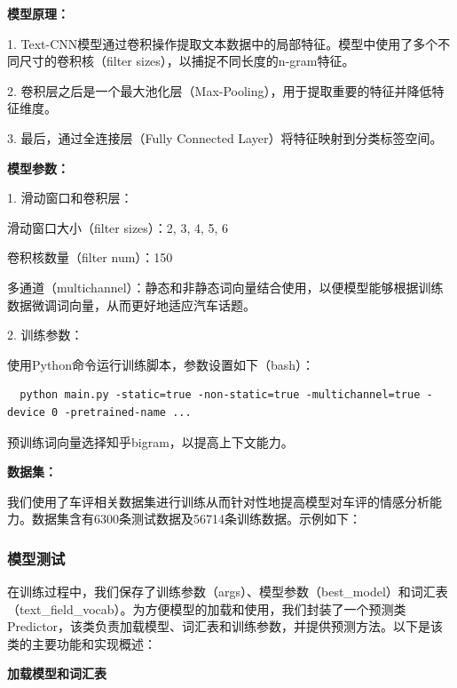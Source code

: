 \documentclass[UTF8,a4paper,15pt,titlepage,oneside]{ctexbook}
\begin{document}
\vskip 0.2cm
\noindent
\textbf{模型原理：}

1. Text-CNN模型通过卷积操作提取文本数据中的局部特征。模型中使用了多个不同尺寸的卷积核（filter sizes），以捕捉不同长度的n-gram特征。

2. 卷积层之后是一个最大池化层（Max-Pooling），用于提取重要的特征并降低特征维度。

3. 最后，通过全连接层（Fully Connected Layer）将特征映射到分类标签空间。

\vskip 0.2cm
\noindent
\textbf{模型参数：}

1. 滑动窗口和卷积层：
 
滑动窗口大小（filter sizes）：2, 3, 4, 5, 6

卷积核数量（filter num）：150

多通道（multichannel）：静态和非静态词向量结合使用，以便模型能够根据训练数据微调词向量，从而更好地适应汽车话题。

2. 训练参数：

使用Python命令运行训练脚本，参数设置如下（bash）：

\begin{mdframed}[backgroundcolor=darkgray, linecolor=lightgray, linewidth=1pt, innermargin=0.5cm, outermargin=0.5cm, skipbelow=0.1cm]
  \color{white}
  \begin{verbatim}
  python main.py -static=true -non-static=true -multichannel=true -device 0 -pretrained-name ...
\end{verbatim}  
\end{mdframed}


预训练词向量选择知乎bigram，以提高上下文能力。

\vskip 0.2cm
\noindent
\textbf{数据集：}

我们使用了车评相关数据集进行训练从而针对性地提高模型对车评的情感分析能力。数据集含有6300条测试数据及56714条训练数据。示例如下：



\subsubsection{模型测试}

在训练过程中，我们保存了训练参数（args）、模型参数（best\_model）和词汇表（text\_field\_vocab）。为方便模型的加载和使用，我们封装了一个预测类Predictor，该类负责加载模型、词汇表和训练参数，并提供预测方法。以下是该类的主要功能和实现概述：

\vskip 0.2cm
\noindent
\textbf{加载模型和词汇表}
\end{document}
